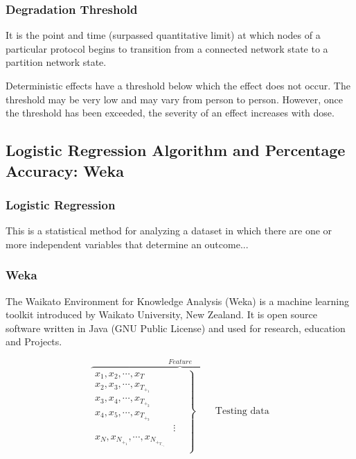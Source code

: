 \documentclass[letterpaper, 10 pt, conference]{ieeeconf}  %
\begin{document}
\subsubsection{Degradation Threshold}

It is the point and time (surpassed quantitative limit) at which nodes of a particular protocol begins to transition from a connected network state to a partition network state.

Deterministic effects have a threshold below which the effect does not occur. The threshold may be very low and may vary from person to person. However, once the threshold has been exceeded, the severity of an effect increases with dose. 








\subsection{Logistic Regression Algorithm and Percentage Accuracy: Weka}


\subsubsection{Logistic Regression}
This is a statistical method for analyzing a dataset in which there are one or more independent variables that determine an outcome...

\subsubsection{Weka}
The Waikato Environment for Knowledge Analysis (Weka) is a machine learning toolkit introduced by Waikato University, New Zealand. It is open   source software written in Java (GNU   Public   License) and used for research, education and Projects. 



\begin{equation}
\overbrace{
 \left.\begin{aligned}
        x_1, x_2, \cdots, x_T\\
        x_2, x_3, \cdots, x_T_+_1\\
        x_3, x_4, \cdots, x_T_+_2\\
        x_4, x_5, \cdots, x_T_+_3\\
         & \vdots& \\
        x_N, x_N_+_1, \cdots, x_N_+_T_-_1\\
       \end{aligned}
 \right\}
 \qquad \text{Testing data}
 }^{Feature}
\end{equation}
\end{document}
